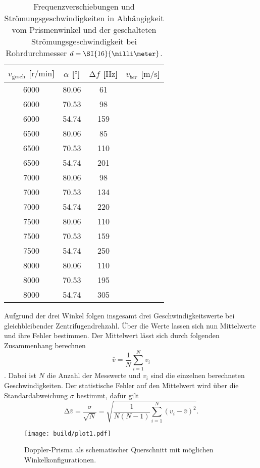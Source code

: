 \begin{table}
    \centering
    \caption{Frequenzverschiebungen und Strömungsgeschwindigkeiten in Abhängigkeit vom Prismenwinkel und der geschalteten Strömungsgeschwindigkeit bei Rohrdurchmesser $\protect d = \SI{16}{\milli\meter}$.}
    \label{tab:6}
    \begin{tabular}{c c c c}
        \toprule
        $v_{\text{gesch}}$ [$\si{{\text{r}}\per\minute}$]  & $\alpha$ [$\si{\degree}$]  & $\increment f$ [$\si{\hertz}$] & $v_{ber}$ [$\si{\meter\per\second}$]\\
        \midrule
        6000    &   80.06    & 61   & ~ \\ 
        6000    &   70.53    & 98   & ~ \\ 
        6000    &   54.74    & 159   & ~ \\ 
        \midrule
        6500    &   80.06   & 85    & ~ \\ 
        6500    &   70.53   & 110    & ~ \\ 
        6500    &   54.74   & 201    & ~ \\ 
        \midrule
        7000    &   80.06   & 98    & ~ \\ 
        7000    &   70.53   & 134    & ~ \\ 
        7000    &   54.74   & 220    & ~ \\ 
        \midrule
        7500    &   80.06   & 110    & ~ \\ 
        7500    &   70.53   & 159    & ~ \\ 
        7500    &   54.74   & 250   & ~ \\ 
        \midrule
        8000    &   80.06   & 110    & ~ \\ 
        8000    &   70.53   & 195    & ~ \\ 
        8000    &   54.74   & 305   & ~ \\ 
        \bottomrule
    \end{tabular}
\end{table}   
                            
Aufgrund der drei Winkel folgen insgesamt drei Geschwindigkeitswerte bei gleichbleibender Zentrifugendrehzahl. Über die Werte lassen sich nun Mittelwerte und ihre Fehler bestimmen.
Der Mittelwert lässt sich durch folgenden Zusammenhang berechnen
\begin{equation}
    \label{eqn:mittel}
\bar{v} = \frac{1}{N} \sum_{i=1}^{N} v_{i}
\end{equation}.
Dabei ist $N$ die Anzahl der Messwerte und $v_{i}$ sind die einzelnen berechneten Geschwindigkeiten.
Der statistische Fehler auf den Mittelwert wird über die Standardabweichung $\sigma$ bestimmt, dafür gilt
\begin{equation}
    \label{eqn:sem}
\increment \bar{v} = \frac{\sigma}{\sqrt{N}} = \sqrt{\frac{1}{N(N-1)} \sum_{i=1}^{N} (v_{i} - \bar{v})^{2}}.
\end{equation}            
                           
                        


\begin{figure}
    \centering
    \texttt{[image: build/plot1.pdf]}
    \caption{Doppler-Prisma als schematischer Querschnitt mit möglichen Winkelkonfigurationen. \cite{skript}} 
    \label{fig:figskizze1}
\end{figure}